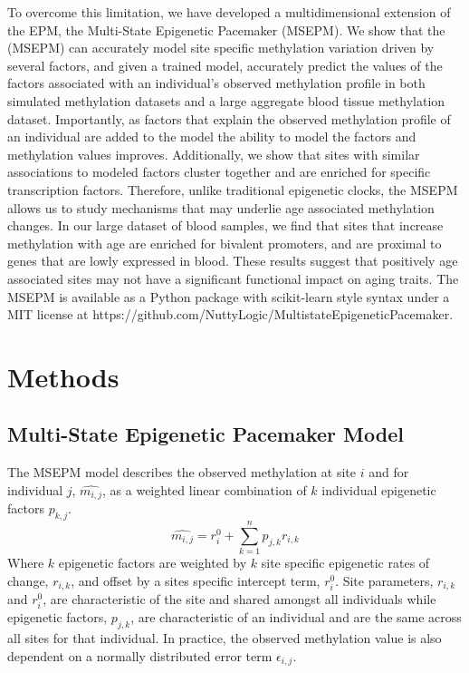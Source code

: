 \documentclass[sn-nature]{sn-jnl}
\begin{document}
{\begin{linenumbers}
To overcome this limitation, we have developed a multidimensional extension of the EPM, the Multi-State 
Epigenetic Pacemaker (MSEPM).  We show that the (MSEPM) can accurately model  site specific methylation 
variation driven by several factors, and given a trained model, accurately predict the values of the 
factors associated with an individual’s observed methylation profile in both simulated methylation 
datasets and a large aggregate blood tissue methylation dataset. Importantly, as factors that explain 
the observed methylation profile of an individual are added to the model the ability to model the factors 
and methylation values improves. Additionally, we show that sites with similar associations to modeled factors 
cluster together and are enriched for specific transcription factors. Therefore, unlike traditional epigenetic 
clocks, the MSEPM allows us to study mechanisms that may underlie age associated methylation changes.  In our 
large dataset of blood samples, we find that sites that increase methylation with age are enriched for bivalent 
promoters, and are proximal to genes that are lowly expressed in blood.  These results suggest that positively 
age associated sites may not have a significant functional impact on aging traits. The MSEPM is available as a 
Python package with scikit-learn style syntax under a MIT license at https://github.com/NuttyLogic/MultistateEpigeneticPacemaker. 

\section{Methods}\label{sec2}

\subsection{Multi-State Epigenetic Pacemaker Model}

The MSEPM model describes the observed methylation at site $i$ and for individual $j$, $\hat{m_{i,j}}$, 
as a weighted linear combination of $k$ individual epigenetic factors $p_{k,j}$. 
$$\hat{m_{i,j}} = r^0_i + \sum^n_{k=1} p_{j,k} r_{i,k}$$ Where $k$ epigenetic factors are weighted by $k$ site specific 
epigenetic rates of change, $r_{i,k}$, and offset by a sites specific intercept term, $r^0_i$. Site parameters,
 $r_{i,k}$ and $r^0_i$, 
are characteristic of the site and shared amongst all individuals while epigenetic factors, $p_{j,k}$, are characteristic 
of an individual and are the same across all sites for that individual. In practice, 
the observed methylation value is also dependent on a normally distributed error term 
$\epsilon_{i,j}$.


\end{linenumbers}}
\end{document}
